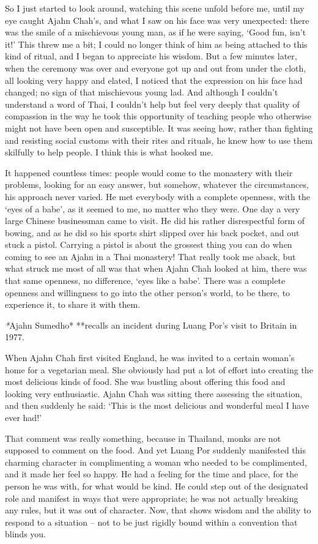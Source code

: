 So I just started to look around, watching this scene unfold before me, 
until my eye caught Ajahn Chah's, and what I saw on his face was very
unexpected: there was the smile of a mischievous young man, as if he
were saying, `Good fun, isn't it!' This threw me a bit; I could no
longer think of him as being attached to this kind of ritual, and I
began to appreciate his wisdom. But a few minutes later, when the
ceremony was over and everyone got up and out from under the cloth, all
looking very happy and elated, I noticed that the expression on his face
had changed; no sign of that mischievous young lad. And although I
couldn't understand a word of Thai, I couldn't help but feel very deeply
that quality of compassion in the way he took this opportunity of
teaching people who otherwise might not have been open and susceptible. 
It was seeing how, rather than fighting and resisting social customs
with their rites and rituals, he knew how to use them skilfully to help
people. I think this is what hooked me. 

It happened countless times: people would come to the monastery with
their problems, looking for an easy answer, but somehow, whatever the
circumstances, his approach never varied. He met everybody with a
complete openness, with the `eyes of a babe', as it seemed to me, no
matter who they were. One day a very large Chinese businessman came to
visit. He did his rather disrespectful form of bowing, and as he did so
his sports shirt slipped over his back pocket, and out stuck a pistol. 
Carrying a pistol is about the grossest thing you can do when coming to
see an Ajahn in a Thai monastery! That really took me aback, but what
struck me most of all was that when Ajahn Chah looked at him, there was
that same openness, no difference, `eyes like a babe'. There was a
complete openness and willingness to go into the other person's world, 
to be there, to experience it, to share it with them. 

\emph{*}Ajahn Sumedho* **recalls an incident during Luang Por's visit to
Britain in 1977. 

When Ajahn Chah first visited England, he was invited to a certain
woman's home for a vegetarian meal. She obviously had put a lot of
effort into creating the most delicious kinds of food. She was bustling
about offering this food and looking very enthusiastic. Ajahn Chah was
sitting there assessing the situation, and then suddenly he said: `This
is the most delicious and wonderful meal I have ever had!'

That comment was really something, because in Thailand, monks are not
supposed to comment on the food. And yet Luang Por suddenly manifested
this charming character in complimenting a woman who needed to be
complimented, and it made her feel so happy. He had a feeling for the
time and place, for the person he was with, for what would be kind. He
could step out of the designated role and manifest in ways that were
appropriate; he was not actually breaking any rules, but it was out of
character. Now, that shows wisdom and the ability to respond to a
situation -- not to be just rigidly bound within a convention that
blinds you. 

